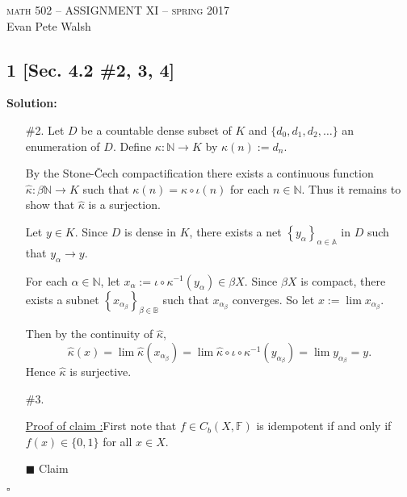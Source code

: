 \documentclass[12pt]{article}
\newcounter{ProofCounter}
\newcounter{ClaimCounter}[ProofCounter]
\newenvironment{Solution}{\stepcounter{ProofCounter}\textbf{Solution:}}{\hfill$\square$}
\newenvironment{claim}[1]{\vspace{1mm}\stepcounter{ClaimCounter}\par\noindent\underline{\bf Claim \theClaimCounter:}\space#1}{}
\newenvironment{claimproof}[1]{\par\noindent\underline{Proof of claim \theClaimCounter:}\space#1}{\hfill $\blacksquare$ Claim \theClaimCounter}
\begin{document}
\thispagestyle{empty}
\begin{center}
  \Large \textsc{math 502 -- ASSIGNMENT XI -- spring 2017} \\ 
  \vspace{5mm}
  \large Evan Pete Walsh
\end{center}


\subsection*{1 [Sec. 4.2 \#2, 3, 4]}
\begin{Solution}
  \begin{enumerate}
    \item[\#2.] Let $D$ be a countable dense subset of $K$ and $\{d_0, d_1, d_2, \dots\}$ an enumeration of $D$. Define $\kappa : \mathbb{N}
      \rightarrow K$ by $\kappa(n) := d_{n}$.

      By the Stone-\v{C}ech compactification there exists a continuous function $\hat{\kappa} : \beta \mathbb{N} \rightarrow K$ such that $\kappa(n) =
      \hat{\kappa}\circ \iota(n)$ for each $n \in \mathbb{N}$. Thus it remains to show that $\hat{\kappa}$ is a surjection.

      Let $y \in K$. Since $D$ is dense in $K$, there exists a net $\left\{ y_\alpha \right\}_{\alpha\in\mathbb{A}}$ in $D$ such that $y_\alpha \rightarrow y$.

      For each $\alpha \in \mathbb{N}$, let $x_\alpha:= \iota \circ \kappa^{-1}(y_\alpha) \in \beta X$. Since $\beta X$ is compact, there exists a
      subnet $\left\{ x_{\alpha_\beta} \right\}_{\beta\in\mathbb{B}}$ such that $x_{\alpha_\beta}$ converges. So let $x := \lim x_{\alpha_\beta}$.

      Then by the continuity of $\hat{\kappa}$,
      \[
        \hat{\kappa}(x) = \lim \hat{\kappa}(x_{\alpha_\beta}) = \lim \hat{\kappa} \circ \iota \circ \kappa^{-1}(y_{\alpha_\beta}) = \lim
        y_{\alpha_\beta} = y.
      \]
      Hence $\hat{\kappa}$ is surjective.

    \item[\#3.]
      \begin{claimproof}
        First note that $f \in C_b(X, \mathbb{F})$ is idempotent if and only if $f(x) \in \{0,1\}$ for all $x \in X$.


\end{claimproof}
\end{enumerate}
\end{Solution}
\end{document}
